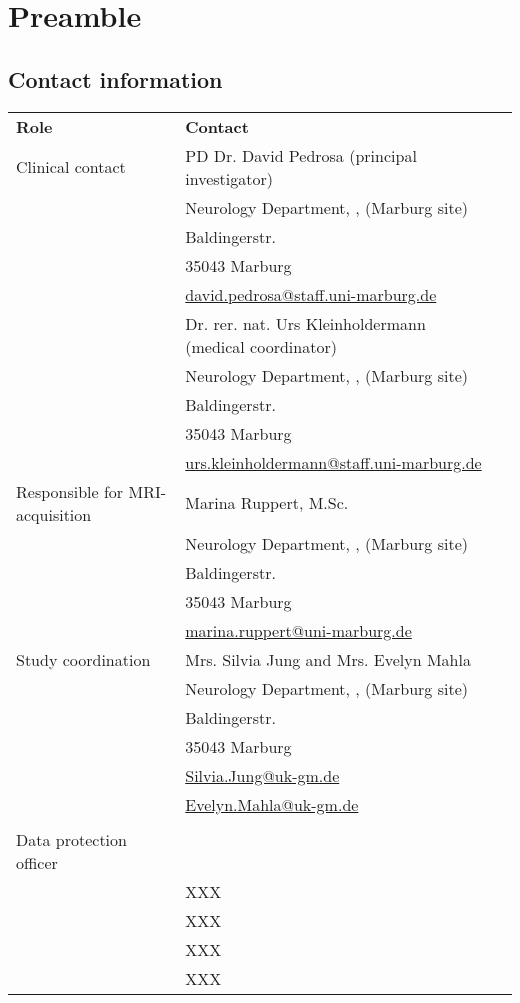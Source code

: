 \chapter{Preamble}
\section{Contact information}
\begin{tabularx}{0.85\textwidth}{@{}lp{9cm} *{1}{l} @{}}
\toprule
\textbf{Role} & \textbf{Contact} \\
\cmidrule{1-2}
Clinical contact 	& PD Dr. David Pedrosa (principal investigator) \\
			& Neurology Department, \UKGM, (Marburg site)\\
			& Baldingerstr.\\
			& 35043 Marburg\\
			& \href{mailto:david.pedrosa@staff.uni-marburg.de}{david.pedrosa@staff.uni-marburg.de}\\
\cmidrule{2-3}
			& Dr. rer. nat. Urs Kleinholdermann (medical coordinator) \\
			& Neurology Department, \UKGM, (Marburg site)\\
			& Baldingerstr.\\
			& 35043 Marburg\\
			& \href{mailto:urs.kleinholdermann@staff.uni-marburg.de}{urs.kleinholdermann@staff.uni-marburg.de}\\

\cmidrule{1-2}
Responsible for \ac{MRI}-acquisition & Marina Ruppert, M.Sc.\\
			& Neurology Department, \UKGM, (Marburg site)\\
			& Baldingerstr.\\
			& 35043 Marburg\\
			& \href{mailto:marina.ruppert@uni-marburg.de}{marina.ruppert@uni-marburg.de}\\
\cmidrule{1-2}
Study coordination & Mrs. Silvia Jung and Mrs. Evelyn Mahla\\
			& Neurology Department, \UKGM, (Marburg site)\\
			& Baldingerstr.\\
			& 35043 Marburg\\
			& \href{mailto:Silvia.Jung@uk-gm.de}{Silvia.Jung@uk-gm.de}\\
			& \href{mailto:Evelyn.Mahla@uk-gm.de}{Evelyn.Mahla@uk-gm.de}\\
	\\

\cmidrule{1-2}
Data protection officer & \\
			& XXX\\
			& XXX\\
			& XXX\\
			& XXX\\
\bottomrule
\end{tabularx}
\newpage

